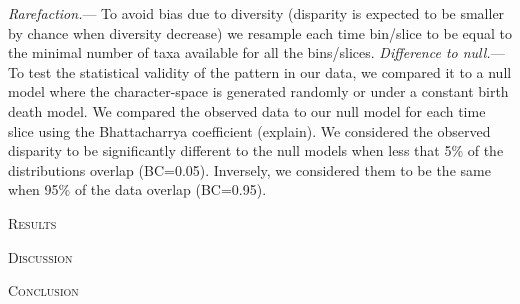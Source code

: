 \documentclass[12pt,letterpaper]{article}
\renewcommand{\section}[1]{%
\bigskip
\begin{center}
\begin{Large}
\normalfont\scshape #1
\medskip
\end{Large}
\end{center}}
\renewcommand{\subsubsection}[1]{%
\vspace{2ex}
\noindent
\textit{#1.}---}
\begin{document}
\subsubsection{Rarefaction}
To avoid bias due to diversity (disparity is expected to be smaller by chance when diversity decrease) we resample each time bin/slice to be equal to the minimal number of taxa available for all the bins/slices.
\subsubsection{Difference to null}
To test the statistical validity of the pattern in our data, we compared it to a null model where the character-space is generated randomly or under a constant birth death model. We compared the observed data to our null model for each time slice using the Bhattacharrya  coefficient (explain). We considered the observed disparity to be significantly different to the null models when less that 5\% of the distributions overlap (BC=0.05). Inversely, we considered them to be the same when 95\% of the data overlap (BC=0.95).

%
%

\section{Results}

%
%

\section{Discussion}


%
%

\section{Conclusion}
\end{document}
